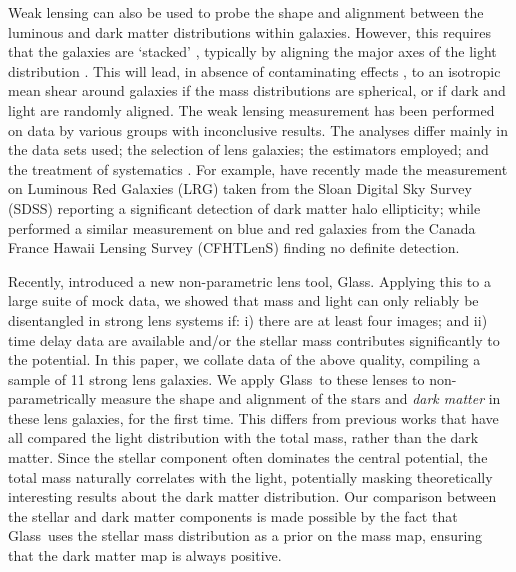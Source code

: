 \documentclass[useAMS,usenatbib]{mn2e}
\def\Glass{{\sc Glass}}
\begin{document}
Weak lensing can also be used to probe the shape and alignment between the luminous and dark matter distributions within galaxies. However, this requires that the galaxies are `stacked' \citep{2000astro.ph..6281B,2000ApJ...538L.113N}, typically by aligning the major axes of the light distribution \citep[e.g.][]{2004ApJ...606...67H}. This will lead, in absence of contaminating effects \citep[e.g. intrinsic alignments;][]{2004PhRvD..70f3526H}, to an isotropic mean shear around galaxies if the mass distributions are spherical, or if dark and light are randomly aligned. The weak lensing measurement has been performed on data by various groups \citep[][]{2004ApJ...606...67H,2006MNRAS.370.1008M,2007ApJ...669...21P,2012A&A...545A..71V} with inconclusive results. The analyses differ mainly in the data sets used; the selection of lens galaxies; the estimators employed; and the treatment of systematics \citep[see e.g.][]{2015arXiv150704301S}. For example, \citet{2015arXiv150603536C} have recently made the measurement on Luminous Red Galaxies (LRG) taken from the Sloan Digital Sky Survey (SDSS) reporting a significant detection of dark matter halo ellipticity; while \citet{2015arXiv150704301S} performed a similar measurement on blue and red galaxies from the Canada France Hawaii Lensing Survey (CFHTLenS) finding no definite detection.

Recently, \citet{2014MNRAS.445.2181C} introduced a new non-parametric lens tool, \Glass. Applying this to a large suite of mock data, we showed that mass and light can only reliably be disentangled in strong lens systems if: i) there are at least four images; and ii) time delay data are available and/or the stellar mass contributes significantly to the potential. In this paper, we collate data of the above quality, compiling a sample of 11 strong lens galaxies. We apply \Glass\ to these lenses to non-parametrically measure the shape and alignment of the stars and {\it dark matter} in these lens galaxies, for the first time. This differs from previous works that have all compared the light distribution with the total mass, rather than the dark matter. Since the stellar component often dominates the central potential, the total mass naturally correlates with the light, potentially masking theoretically interesting results about the dark matter distribution. Our comparison between the stellar and dark matter components is made possible by the fact that \Glass\ uses the stellar mass distribution as a prior on the mass map, ensuring that the dark matter map is always positive.
\end{document}

